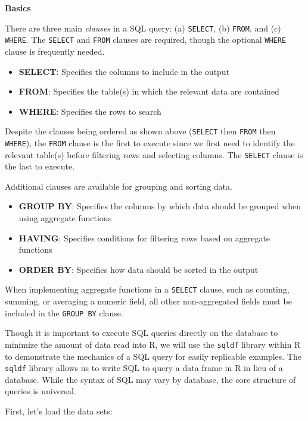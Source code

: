 \documentclass[]{book}
\providecommand{\tightlist}{%
  \setlength{\itemsep}{0pt}\setlength{\parskip}{0pt}}
\begin{document}
\textbf{Basics}

There are three main \emph{clauses} in a SQL query: (a) \texttt{SELECT}, (b) \texttt{FROM}, and (c) \texttt{WHERE}. The \texttt{SELECT} and \texttt{FROM} clauses are required, though the optional \texttt{WHERE} clause is frequently needed.

\begin{itemize}
\tightlist
\item
  \textbf{SELECT}: Specifies the columns to include in the output
\item
  \textbf{FROM}: Specifies the table(s) in which the relevant data are contained
\item
  \textbf{WHERE}: Specifies the rows to search
\end{itemize}

Despite the clauses being ordered as shown above (\texttt{SELECT} then \texttt{FROM} then \texttt{WHERE}), the \texttt{FROM} clause is the first to execute since we first need to identify the relevant table(s) before filtering rows and selecting columns. The \texttt{SELECT} clause is the last to execute.

Additional clauses are available for grouping and sorting data.

\begin{itemize}
\tightlist
\item
  \textbf{GROUP BY}: Specifies the columns by which data should be grouped when using aggregate functions
\item
  \textbf{HAVING}: Specifies conditions for filtering rows based on aggregate functions
\item
  \textbf{ORDER BY}: Specifies how data should be sorted in the output
\end{itemize}

When implementing aggregate functions in a \texttt{SELECT} clause, such as counting, summing, or averaging a numeric field, all other non-aggregated fields must be included in the \texttt{GROUP\ BY} clause.

Though it is important to execute SQL queries directly on the database to minimize the amount of data read into R, we will use the \texttt{sqldf} library within R to demonstrate the mechanics of a SQL query for easily replicable examples. The \texttt{sqldf} library allows us to write SQL to query a data frame in R in lieu of a database. While the syntax of SQL may vary by database, the core structure of queries is universal.

First, let's load the data sets:
\end{document}
